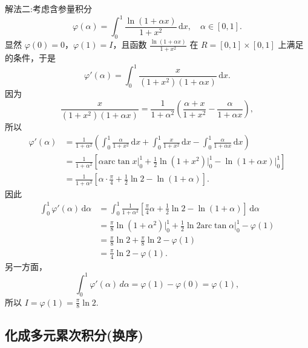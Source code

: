 \documentclass[../../main.tex]{subfiles}
\begin{document}
\begin{solution}
{\color{blue}解法二:}考虑含参量积分
\[
\varphi(\alpha) = \int_{0}^{1} \frac{\ln(1 + \alpha x)}{1 + x^2} \, \mathrm{d}x, \quad \alpha \in [0,1].
\]
显然 \( \varphi(0) = 0 \)，\( \varphi(1) = I \)，且函数 \( \frac{\ln(1 + \alpha x)}{1 + x^2} \) 在 \( R = [0,1] \times [0,1] \) 上满足 的条件，于是
\[
\varphi'(\alpha) = \int_{0}^{1} \frac{x}{(1 + x^2)(1 + \alpha x)} \, \mathrm{d}x.
\]
因为
\[
\frac{x}{(1 + x^2)(1 + \alpha x)} = \frac{1}{1 + \alpha^2} \left( \frac{\alpha + x}{1 + x^2} - \frac{\alpha}{1 + \alpha x} \right),
\]
所以
\begin{align*}
\varphi' \left( \alpha \right) &=\frac{1}{1+\alpha ^2}\left( \int_0^1{\frac{\alpha}{1+x^2}\,\mathrm{d}x}+\int_0^1{\frac{x}{1+x^2}\,\mathrm{d}x}-\int_0^1{\frac{\alpha}{1+\alpha x}\,\mathrm{d}x} \right) 
\\
&=\frac{1}{1+\alpha ^2}\left[ \alpha \mathrm{arc}\tan x\Big|_{0}^{1}+\frac{1}{2}\ln \left( 1+x^2 \right) \Big|_{0}^{1}-\ln \left( 1+\alpha x \right) \Big|_{0}^{1} \right] 
\\
&=\frac{1}{1+\alpha ^2}\left[ \alpha \cdot \frac{\pi}{4}+\frac{1}{2}\ln 2-\ln \left( 1+\alpha \right) \right] .
\end{align*}
因此
\begin{align*}
\int_0^1{\varphi' \left( \alpha \right) \,\mathrm{d}\alpha}&=\int_0^1{\frac{1}{1+\alpha ^2}\left[ \frac{\pi}{4}\alpha +\frac{1}{2}\ln 2-\ln \left( 1+\alpha \right) \right] \,\mathrm{d}\alpha}
\\
&=\frac{\pi}{8}\ln \left( 1+\alpha ^2 \right) \Big|_{0}^{1}+\frac{1}{2}\ln 2\mathrm{arc}\tan \alpha \Big|_{0}^{1}-\varphi \left( 1 \right) 
\\
&=\frac{\pi}{8}\ln 2+\frac{\pi}{8}\ln 2-\varphi \left( 1 \right) 
\\
&=\frac{\pi}{4}\ln 2-\varphi \left( 1 \right) .
\end{align*}
另一方面，
\[
\int_{0}^{1} \varphi'(\alpha) \, d\alpha = \varphi(1) - \varphi(0) = \varphi(1),
\]
所以 \( I = \varphi(1) = \frac{\pi}{8} \ln 2 \).
\end{solution}









\subsection{化成多元累次积分(换序)}
\end{document}
